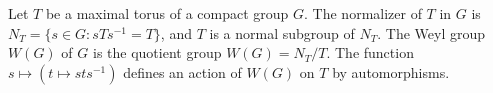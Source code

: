Let $T$ be a maximal torus of a compact group $G$. The normalizer of $T$ in $G$ is $N_T = \{s \in G : sTs^{-1} = T\}$, and $T$ is a normal subgroup of $N_T$. The Weyl group $W(G)$ of $G$ is the quotient group $W(G) = N_T / T$. The function $s \mapsto (t \mapsto sts^{-1})$ defines an action of $W(G)$ on $T$ by automorphisms.
